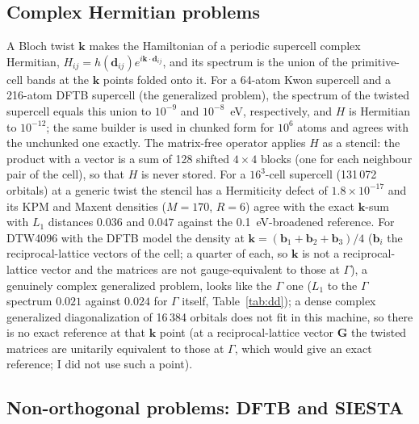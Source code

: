 \documentclass[reprint,nofootinbib,superscriptaddress,amsmath,amssymb,aps,prb,floatfix]{revtex4-2}
\begin{document}
\subsection{Complex Hermitian problems}
\label{sec:val_cplx}

A Bloch twist $\mathbf k$ makes the Hamiltonian of a periodic supercell complex Hermitian, $H_{ij}=h(\mathbf d_{ij})e^{i\mathbf k\cdot\mathbf d_{ij}}$, and its spectrum is the union of the primitive-cell bands at the $\mathbf k$ points folded onto it.
For a 64-atom Kwon supercell and a 216-atom DFTB supercell (the generalized problem), the spectrum of the twisted supercell equals this union to $10^{-9}$ and $10^{-8}$~eV, respectively, and $H$ is Hermitian to $10^{-12}$; the same builder is used in chunked form for $10^6$ atoms and agrees with the unchunked one exactly.
The matrix-free operator applies $H$ as a stencil: the product with a vector is a sum of 128 shifted $4\times4$ blocks (one for each neighbour pair of the cell), so that $H$ is never stored. For a $16^3$-cell supercell (131\,072 orbitals) at a generic twist the stencil has a Hermiticity defect of $1.8\times10^{-17}$ and its KPM and Maxent densities ($M=170$, $R=6$) agree with the exact $\mathbf k$-sum with $L_1$ distances $0.036$ and $0.047$ against the 0.1~eV-broadened reference.
For DTW4096 with the DFTB model the density at $\mathbf k=(\mathbf b_1+\mathbf b_2+\mathbf b_3)/4$ ($\mathbf b_i$ the reciprocal-lattice vectors of the cell; a quarter of each, so $\mathbf k$ is not a reciprocal-lattice vector and the matrices are not gauge-equivalent to those at $\Gamma$), a genuinely complex generalized problem, looks like the $\Gamma$ one ($L_1$ to the $\Gamma$ spectrum $0.021$ against $0.024$ for $\Gamma$ itself, Table~\ref{tab:dd}); a dense complex generalized diagonalization of 16\,384 orbitals does not fit in this machine, so there is no exact reference at that $\mathbf k$ point (at a reciprocal-lattice vector $\mathbf G$ the twisted matrices are unitarily equivalent to those at $\Gamma$, which would give an exact reference; I did not use such a point).

\subsection{Non-orthogonal problems: DFTB and SIESTA}
\label{sec:val_dftb}
\end{document}
